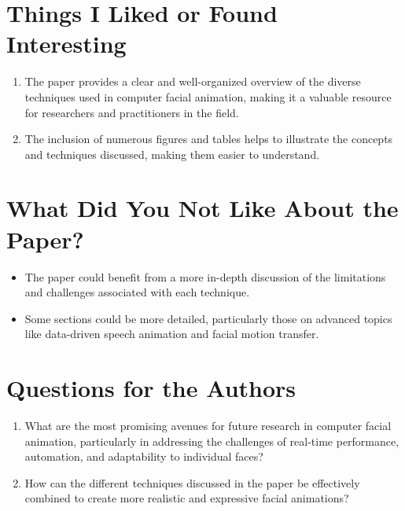 \documentclass[12pt]{article}
\begin{document}
\section{Things I Liked or Found Interesting}
\begin{enumerate}[noitemsep]
    \item The paper provides a clear and well-organized overview of the diverse techniques used in computer facial animation, making it a valuable resource for researchers and practitioners in the field.
    \item The inclusion of numerous figures and tables helps to illustrate the concepts and techniques discussed, making them easier to understand.
\end{enumerate}

\section{What Did You Not Like About the Paper?}
\begin{itemize}[noitemsep]
    \item The paper could benefit from a more in-depth discussion of the limitations and challenges associated with each technique.
    \item Some sections could be more detailed, particularly those on advanced topics like data-driven speech animation and facial motion transfer.
\end{itemize}

\section{Questions for the Authors}
\begin{enumerate}[noitemsep]
    \item What are the most promising avenues for future research in computer facial animation, particularly in addressing the challenges of real-time performance, automation, and adaptability to individual faces?
    \item How can the different techniques discussed in the paper be effectively combined to create more realistic and expressive facial animations?
\end{enumerate}
\end{document}
